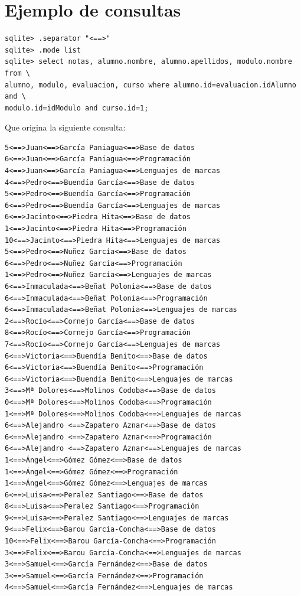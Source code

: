 \documentclass[4paper]{article}
\begin{document}
\section{Ejemplo de consultas}
\begin{verbatim}
sqlite> .separator "<==>"     
sqlite> .mode list
sqlite> select notas, alumno.nombre, alumno.apellidos, modulo.nombre from \
alumno, modulo, evaluacion, curso where alumno.id=evaluacion.idAlumno and \
modulo.id=idModulo and curso.id=1;
\end{verbatim}
Que origina la siguiente consulta:
\begin{verbatim}
5<==>Juan<==>García Paniagua<==>Base de datos
6<==>Juan<==>García Paniagua<==>Programación
4<==>Juan<==>García Paniagua<==>Lenguajes de marcas
4<==>Pedro<==>Buendía García<==>Base de datos
5<==>Pedro<==>Buendía García<==>Programación
6<==>Pedro<==>Buendía García<==>Lenguajes de marcas
6<==>Jacinto<==>Piedra Hita<==>Base de datos
1<==>Jacinto<==>Piedra Hita<==>Programación
10<==>Jacinto<==>Piedra Hita<==>Lenguajes de marcas
5<==>Pedro<==>Nuñez García<==>Base de datos
6<==>Pedro<==>Nuñez García<==>Programación
1<==>Pedro<==>Nuñez García<==>Lenguajes de marcas
6<==>Inmaculada<==>Beñat Polonia<==>Base de datos
6<==>Inmaculada<==>Beñat Polonia<==>Programación
6<==>Inmaculada<==>Beñat Polonia<==>Lenguajes de marcas
2<==>Rocío<==>Cornejo García<==>Base de datos
8<==>Rocío<==>Cornejo García<==>Programación
7<==>Rocío<==>Cornejo García<==>Lenguajes de marcas
6<==>Victoria<==>Buendía Benito<==>Base de datos
6<==>Victoria<==>Buendía Benito<==>Programación
6<==>Victoria<==>Buendía Benito<==>Lenguajes de marcas
3<==>Mª Dolores<==>Molinos Codoba<==>Base de datos
0<==>Mª Dolores<==>Molinos Codoba<==>Programación
1<==>Mª Dolores<==>Molinos Codoba<==>Lenguajes de marcas
6<==>Alejandro <==>Zapatero Aznar<==>Base de datos
6<==>Alejandro <==>Zapatero Aznar<==>Programación
6<==>Alejandro <==>Zapatero Aznar<==>Lenguajes de marcas
1<==>Ángel<==>Gómez Gómez<==>Base de datos
1<==>Ángel<==>Gómez Gómez<==>Programación
1<==>Ángel<==>Gómez Gómez<==>Lenguajes de marcas
6<==>Luisa<==>Peralez Santiago<==>Base de datos
8<==>Luisa<==>Peralez Santiago<==>Programación
9<==>Luisa<==>Peralez Santiago<==>Lenguajes de marcas
9<==>Felix<==>Barou García-Concha<==>Base de datos
10<==>Felix<==>Barou García-Concha<==>Programación
3<==>Felix<==>Barou García-Concha<==>Lenguajes de marcas
3<==>Samuel<==>García Fernández<==>Base de datos
3<==>Samuel<==>García Fernández<==>Programación
4<==>Samuel<==>García Fernández<==>Lenguajes de marcas
\end{verbatim}
\end{document}
